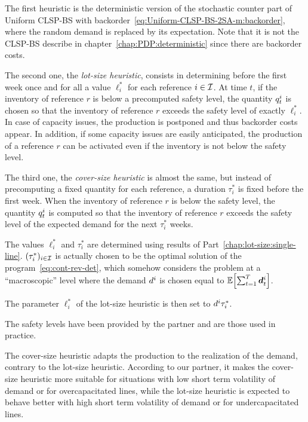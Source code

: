 The first heuristic is the deterministic version of the stochastic counter part of Uniform CLSP-BS with backorder~\eqref{eq:Uniform-CLSP-BS-2SA-m:backorder}, where the random demand is replaced by its expectation. Note that it is not the CLSP-BS describe in chapter~\ref{chap:PDP:deterministic} since there are backorder costs.


The second one, the {\em lot-size heuristic}, consists in determining before the first week once and for all a value $\ell_i^*$ for each reference $i\in\mathcal{I}$.
At time $t$, if the inventory of reference $r$ is below a precomputed safety level, the quantity $q_t^i$ is chosen so that the inventory of reference $r$ exceeds the safety level of exactly $\ell_i^*$.
In case of capacity issues, the production is postponed and thus backorder costs appear. In addition, if some capacity issues are easily anticipated, the production of a reference $r$ can be activated even if the inventory is not below the safety level.


The third one, the {\em cover-size heuristic} is almost the same, but instead of precomputing a fixed quantity for each reference, a duration $\tau_i^*$ is fixed before the first week. When the inventory of reference $r$ is below the safety level, the quantity $q_t^i$ is computed so that the inventory of reference $r$ exceeds the safety level of the expected demand for the next $\tau_i^*$ weeks.


The values $\ell_i^*$ and $\tau_i^*$ are determined using results of Part~\ref{chap:lot-size:single-line}. $(\tau_i^*)_{i\in\mathcal{I}}$ is actually chosen to be the optimal solution of the program~\eqref{eq:cont-rev-det}, which somehow considers the problem at a ``macroscopic'' level
where the demand $d^i$ is chosen equal to $\espe\sqbracket{\sum_{t=1}^{\horizon}\va d_t^i}$.

The parameter $\ell_i^*$ of the lot-size heuristic is then set to $d^i\tau_i^*$.

The safety levels have been provided by the partner and are those used in practice.


The cover-size heuristic adapts the production to the realization of the demand, contrary to the lot-size heuristic. According to our partner, it makes the cover-size heuristic more suitable for situations with low short term volatility of demand or for overcapacitated lines, while the lot-size heuristic is expected to behave better with high short term volatility of demand or for undercapacitated lines.

